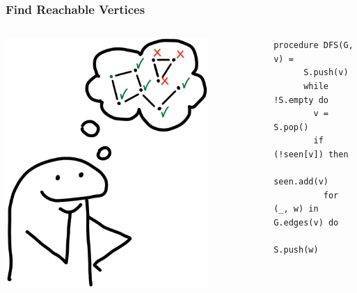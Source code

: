 \documentclass[xcolor={dvipsnames}, aspectratio=169]{beamer}
\begin{document}
\begin{frame}[fragile]
  \frametitle{Find Reachable Vertices}
  \begin{columns}    
    \begin{column}{0.35\textwidth}
      \centering
      \includegraphics[width=0.8\textwidth]{pic/reachableAns.jpg}
    \end{column}
    \begin{column}{0.75\textwidth} 
      \begin{lstlisting}[language=imperative]
    procedure DFS(G, v) = 
      S.push(v)
      while !S.empty do
        v = S.pop()
        if (!seen[v]) then
          seen.add(v)
          for (_, w) in G.edges(v) do 
            S.push(w)
      \end{lstlisting}
    \end{column}
    \end{columns}
\end{frame}
\end{document}
